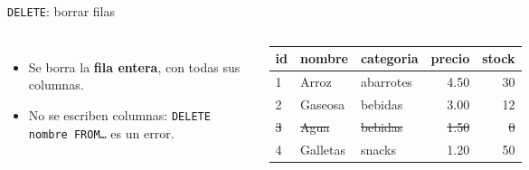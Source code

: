 \documentclass[aspectratio=169,10pt,c]{beamer}
\newcommand{\kw}[1]{\textcolor{utpRojo}{\textbf{#1}}}
\newcommand{\fuera}[1]{\color{utpGrisMedio}\sout{#1}}
\newcommand{\pieza}[3]{%
  \node[pieza] at (0,#1) {#2};
  \node[para] at (8.6,#1) {\textcolor{utpRojo}{$\blacktriangleleft$}\ #3};}
\newcommand{\cabproducto}{%
  \normalfont\bfseries id & \normalfont\bfseries nombre & \normalfont\bfseries categoria
  & \normalfont\bfseries precio & \normalfont\bfseries stock \\}
\begin{document}
\begin{frame}{\texttt{DELETE}: borrar filas}
\begin{center}
\end{center}
\vspace{0.3cm}
\begin{columns}[c,onlytextwidth]
\small
\begin{itemize}\setlength\itemsep{4pt}
  \item Se borra la \textbf{fila entera}, con todas sus columnas.
  \item No se escriben columnas: \texttt{DELETE nombre FROM\ldots} es un error.
\end{itemize}
\centering\scriptsize\ttfamily
\begin{tabular}{lllrr}
\toprule
\cabproducto
\midrule
1 & Arroz & abarrotes & 4.50 & 30 \\
2 & Gaseosa & bebidas & 3.00 & 12 \\
\fuera{3} & \fuera{Agua} & \fuera{bebidas} & \fuera{1.50} & \fuera{0} \\
4 & Galletas & snacks & 1.20 & 50 \\
\bottomrule
\end{tabular}
\end{columns}
\vspace{0.35cm}
\end{frame}
\end{document}
